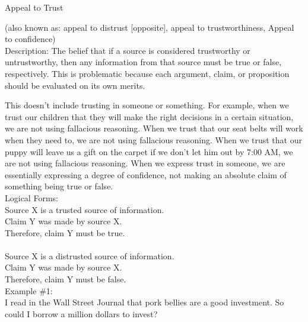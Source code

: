 \documentclass[a4paper,12pt,single,pdftex]{scrbook}
\begin{document}
  

Appeal to Trust
    
      (also known as: appeal to distrust [opposite], appeal to trustworthiness, Appeal to confidence)
    \\

  
    Description: The belief that if a source is considered trustworthy or untrustworthy, then any information from that source must be true or false, respectively. This is problematic because each argument, claim, or proposition should be evaluated on its own merits.

    
      This doesn't include trusting in someone or something. For example, when we trust our children that they will make the right decisions in a certain situation, we are not using fallacious reasoning. When we trust that our seat belts will work when they need to, we are not using fallacious reasoning. When we trust that our puppy will leave us a gift on the carpet if we don't let him out by 7:00 AM, we are not using fallacious reasoning. When we express trust in someone, we are essentially expressing a degree of confidence, not making an absolute claim of something being true or false.
    \\

    
      Logical Forms:
    \\

    
      Source X is a trusted source of information.
    \\

    
      Claim Y was made by source X.
    \\

    
      Therefore, claim Y must be true.
    \\

    
       
    \\

    
      Source X is a distrusted source of information.
    \\

    
      Claim Y was made by source X.
    \\

    
      Therefore, claim Y must be false.
    \\

    
      Example \#1:
    \\

    
      I read in the Wall Street Journal that pork bellies are a good investment. So could I borrow a million dollars to invest?
    \\
\end{document}
